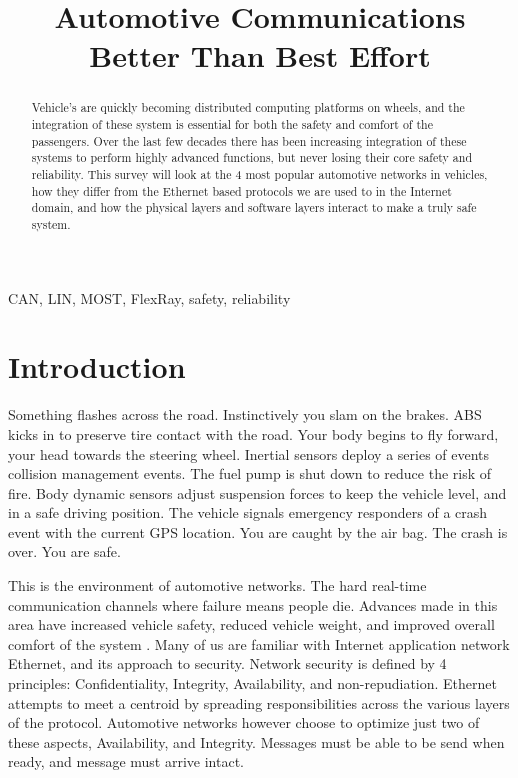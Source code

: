 \documentclass[conference,12pt]{IEEEtran}
\begin{document}
%
\title{Automotive Communications \\ \large{Better Than Best Effort}}

\author{
}
\maketitle
\begin{abstract}
Vehicle's are quickly becoming distributed computing platforms on wheels, and
the integration of these system is essential for both the safety and comfort of
the passengers. Over the last few decades there has been increasing integration
of these systems to perform highly advanced functions, but never losing their
core safety and reliability. This survey will look at the 4 most
popular automotive networks in vehicles, how they differ from the Ethernet based
protocols we are used to in the Internet domain, and how the physical layers and
software layers interact to make a truly safe system. 
\end{abstract}

\begin{IEEEkeywords}
CAN, LIN, MOST, FlexRay, safety, reliability
\end{IEEEkeywords}

\section{Introduction}

Something flashes across the road. Instinctively you slam on the brakes. ABS
kicks in to preserve tire contact with the road. Your body begins to fly
forward, your head towards the steering wheel. Inertial sensors deploy a series
of events collision management events. The fuel pump is shut down to reduce the
risk of fire. Body dynamic sensors adjust suspension forces to keep the vehicle
level, and in a safe driving position. The vehicle signals emergency responders
of a crash event with the current GPS location. You are caught by the air bag.
The crash is over. You are safe. 

This is the environment of automotive networks.
The hard real-time communication channels where failure means people die.
Advances made in this area have increased vehicle safety, reduced vehicle
weight, and improved overall comfort of the system \autocite{navet_trends_2005}. Many of us are familiar with
Internet application network Ethernet, and its approach to security. Network
security is defined by 4 principles: Confidentiality, Integrity, Availability,
and non-repudiation.   Ethernet attempts to meet a centroid by spreading
responsibilities across the various layers of the protocol. Automotive networks
however choose to optimize just two of these aspects, Availability, and Integrity.
Messages must be able to be send when ready, and message must arrive intact.
\end{document}
